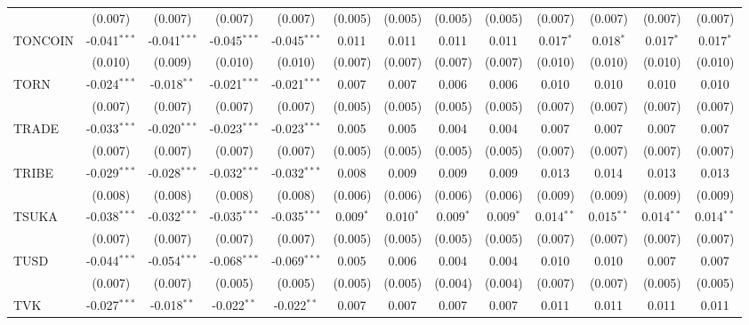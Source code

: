\begin{table}[!htbp]
\begin{tabular}{@{\extracolsep{5pt}}lcccccccccccc}
  & (0.007) & (0.007) & (0.007) & (0.007) & (0.005) & (0.005) & (0.005) & (0.005) & (0.007) & (0.007) & (0.007) & (0.007) \\
 TONCOIN & -0.041$^{***}$ & -0.041$^{***}$ & -0.045$^{***}$ & -0.045$^{***}$ & 0.011$^{}$ & 0.011$^{}$ & 0.011$^{}$ & 0.011$^{}$ & 0.017$^{*}$ & 0.018$^{*}$ & 0.017$^{*}$ & 0.017$^{*}$ \\
  & (0.010) & (0.009) & (0.010) & (0.010) & (0.007) & (0.007) & (0.007) & (0.007) & (0.010) & (0.010) & (0.010) & (0.010) \\
 TORN & -0.024$^{***}$ & -0.018$^{**}$ & -0.021$^{***}$ & -0.021$^{***}$ & 0.007$^{}$ & 0.007$^{}$ & 0.006$^{}$ & 0.006$^{}$ & 0.010$^{}$ & 0.010$^{}$ & 0.010$^{}$ & 0.010$^{}$ \\
  & (0.007) & (0.007) & (0.007) & (0.007) & (0.005) & (0.005) & (0.005) & (0.005) & (0.007) & (0.007) & (0.007) & (0.007) \\
 TRADE & -0.033$^{***}$ & -0.020$^{***}$ & -0.023$^{***}$ & -0.023$^{***}$ & 0.005$^{}$ & 0.005$^{}$ & 0.004$^{}$ & 0.004$^{}$ & 0.007$^{}$ & 0.007$^{}$ & 0.007$^{}$ & 0.007$^{}$ \\
  & (0.007) & (0.007) & (0.007) & (0.007) & (0.005) & (0.005) & (0.005) & (0.005) & (0.007) & (0.007) & (0.007) & (0.007) \\
 TRIBE & -0.029$^{***}$ & -0.028$^{***}$ & -0.032$^{***}$ & -0.032$^{***}$ & 0.008$^{}$ & 0.009$^{}$ & 0.009$^{}$ & 0.009$^{}$ & 0.013$^{}$ & 0.014$^{}$ & 0.013$^{}$ & 0.013$^{}$ \\
  & (0.008) & (0.008) & (0.008) & (0.008) & (0.006) & (0.006) & (0.006) & (0.006) & (0.009) & (0.009) & (0.009) & (0.009) \\
 TSUKA & -0.038$^{***}$ & -0.032$^{***}$ & -0.035$^{***}$ & -0.035$^{***}$ & 0.009$^{*}$ & 0.010$^{*}$ & 0.009$^{*}$ & 0.009$^{*}$ & 0.014$^{**}$ & 0.015$^{**}$ & 0.014$^{**}$ & 0.014$^{**}$ \\
  & (0.007) & (0.007) & (0.007) & (0.007) & (0.005) & (0.005) & (0.005) & (0.005) & (0.007) & (0.007) & (0.007) & (0.007) \\
 TUSD & -0.044$^{***}$ & -0.054$^{***}$ & -0.068$^{***}$ & -0.069$^{***}$ & 0.005$^{}$ & 0.006$^{}$ & 0.004$^{}$ & 0.004$^{}$ & 0.010$^{}$ & 0.010$^{}$ & 0.007$^{}$ & 0.007$^{}$ \\
  & (0.007) & (0.007) & (0.005) & (0.005) & (0.005) & (0.005) & (0.004) & (0.004) & (0.007) & (0.007) & (0.005) & (0.005) \\
 TVK & -0.027$^{***}$ & -0.018$^{**}$ & -0.022$^{**}$ & -0.022$^{**}$ & 0.007$^{}$ & 0.007$^{}$ & 0.007$^{}$ & 0.007$^{}$ & 0.011$^{}$ & 0.011$^{}$ & 0.011$^{}$ & 0.011$^{}$ \\

\end{tabular}
\end{table}
